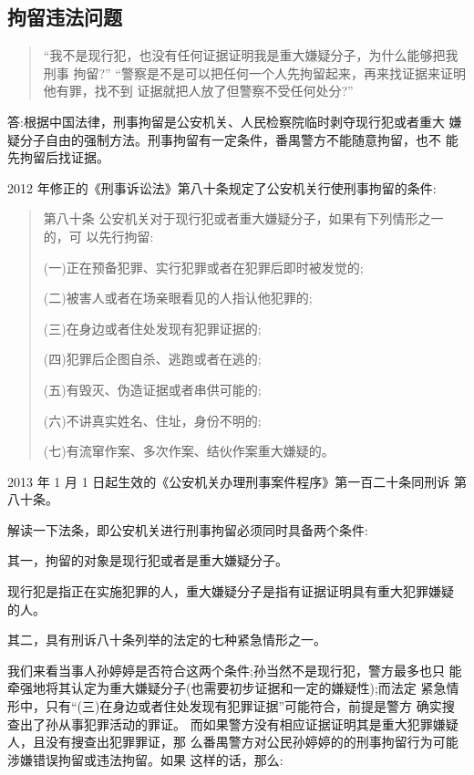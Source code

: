\documentclass{ctexart}
\begin{document}
\subsection{拘留违法问题}
\begin{quotation}
  “我不是现行犯，也没有任何证据证明我是重大嫌疑分子，为什么能够把我刑事 拘留?” “警察是不是可以把任何一个人先拘留起来，再来找证据来证明他有罪，找不到 证据就把人放了但警察不受任何处分?”
\end{quotation}\par
答:根据中国法律，刑事拘留是公安机关、人民检察院临时剥夺现行犯或者重大 嫌疑分子自由的强制方法。刑事拘留有一定条件，番禺警方不能随意拘留，也不 能先拘留后找证据。
\par
2012 年修正的《刑事诉讼法》第八十条规定了公安机关行使刑事拘留的条件:
\begin{quotation}
  第八十条 公安机关对于现行犯或者重大嫌疑分子，如果有下列情形之一的，可 以先行拘留:\par
(一)正在预备犯罪、实行犯罪或者在犯罪后即时被发觉的; \par(二)被害人或者在场亲眼看见的人指认他犯罪的;\par
(三)在身边或者住处发现有犯罪证据的;\par (四)犯罪后企图自杀、逃跑或者在逃的;\par (五)有毁灭、伪造证据或者串供可能的;\par (六)不讲真实姓名、住址，身份不明的;\par (七)有流窜作案、多次作案、结伙作案重大嫌疑的。
\end{quotation}\par
2013 年 1 月 1 日起生效的《公安机关办理刑事案件程序》第一百二十条同刑诉 第八十条。\par
解读一下法条，即公安机关进行刑事拘留必须同时具备两个条件:\par
其一，拘留的对象是现行犯或者是重大嫌疑分子。\par
现行犯是指正在实施犯罪的人，重大嫌疑分子是指有证据证明具有重大犯罪嫌疑 的人。
\par
其二，具有刑诉八十条列举的法定的七种紧急情形之一。\par
\medskip
我们来看当事人孙婷婷是否符合这两个条件;孙当然不是现行犯，警方最多也只 能牵强地将其认定为重大嫌疑分子(也需要初步证据和一定的嫌疑性);而法定 紧急情形中，只有“(三)在身边或者住处发现有犯罪证据”可能符合，前提是警方 确实搜查出了孙从事犯罪活动的罪证。
\medskip
而如果警方没有相应证据证明其是重大犯罪嫌疑人，且没有搜查出犯罪罪证，那 么番禺警方对公民孙婷婷的的刑事拘留行为可能涉嫌错误拘留或违法拘留。如果
这样的话，那么:\par
\end{document}
